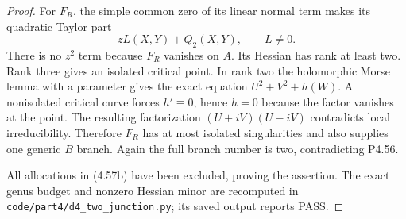 \begin{proof}
For $F_R$, the simple common zero of its linear normal
term makes its quadratic Taylor part
\[
                       zL(X,Y)+Q_2(X,Y),\qquad L\ne0.
\]
There is no $z^2$ term because $F_R$ vanishes on $A$.
Its Hessian has rank at least two. Rank three gives an
isolated critical point. In rank two the holomorphic
Morse lemma with a parameter gives the exact equation
$U^2+V^2+h(W)$. A nonisolated critical curve forces
$h'\equiv0$, hence $h=0$ because the factor vanishes
at the point. The resulting factorization
$(U+iV)(U-iV)$ contradicts local irreducibility.
Therefore $F_R$ has at most isolated singularities and
also supplies one generic $B$ branch. Again the full
branch number is two, contradicting P4.56.

All allocations in (4.57b) have been excluded, proving
the assertion. The exact genus budget and nonzero
Hessian minor are recomputed in
\texttt{code/part4/d4\_two\_junction.py}; its saved
output reports PASS.
\end{proof}
